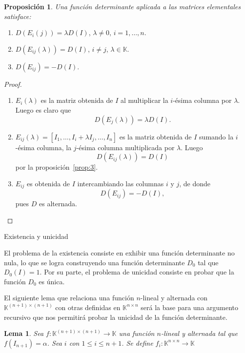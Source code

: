 \documentclass[b5paper, 11pt]{book}
\newcommand{\0}{\mathbf{0}}
\theoremstyle{estiloB}
\theoremstyle{estiloC}
\theoremstyle{estiloD}
\newtheorem{proposition}{Proposición}[section]
\newtheorem{lemma}{Lema}[section]
\begin{document}
\begin{proposition}
	Una función determinante aplicada a las matrices elementales satisface:
\end{proposition}
\begin{enumerate}[1)~]
	\item $D\left(E_{i}\left(j\right)\right)=\lambda D\left(I\right)$, $\lambda\neq0$, $i=1,\ldots,n$.
	\item $D\left(E_{ij}\left(\lambda\right)\right)=D\left(I\right)$, $i\neq j$, $\lambda\in\mathbb{K}$.
	\item $D\left(E_{ij}\right)=-D\left(I\right)$.
\end{enumerate}
\begin{proof}
	\begin{enumerate}[1)~]
		\item $E_{i}\left(\lambda\right)$ es la matriz obtenida de $I$ al multiplicar la $i$-ésima columna por $\lambda$. Luego es claro que \[ D\left(E_{j}\left(\lambda\right)\right)=\lambda D\left(I\right). \]
		\item $E_{ij}\left(\lambda\right)=\left[I_{1},\ldots, I_{i}+\lambda I_{j},\ldots, I_{n}\right]$ es la matriz obtenida de $I$ sumando la $i$-ésima columna, la $j$-ésima columna multiplicada por $\lambda$. Luego \[ D\left(E_{ij}\left(\lambda\right)\right)=D\left(I\right) \] por la proposición~\ref{prop:3}.
		\item $E_{ij}$ es obtenida de $I$ intercambiando las columnas $i$ y $j$, de donde \[ D\left(E_{ij}\right)=-D\left(I\right), \] pues $D$ es alternada.
	\end{enumerate}
\end{proof}

Existencia y unicidad

El problema de la existencia consiste en exhibir una función determinante no nula, lo que se logra construyendo una función determinante $D_{0}$ tal que $D_{0}\left(I\right)=1$. Por su parte, el problema de unicidad consiste en probar que la función $D_{0}$ es única.

El siguiente lema que relaciona una función $n$-lineal y alternada con $\mathbb{K}^{\left(n+1\right)\times\left(n+1\right)}$ con otras definidas en $\mathbb{K}^{n\times n}$ será la base para una argumento recursivo que nos permitirá probar la unicidad de la función determinante.

\begin{lemma}
	Sea $f\colon\mathbb{K}^{\left(n+1\right)\times\left(n+1\right)}\longrightarrow\mathbb{K}$ una función $n$-lineal y alternada tal que $f\left(I_{n+1}\right)=\alpha$. Sea $i$ con $1\le i\le n+1$. Se define $f_{i}\colon\mathbb{K}^{n\times n}\longrightarrow\mathbb{K}$
\end{lemma}
\end{document}
